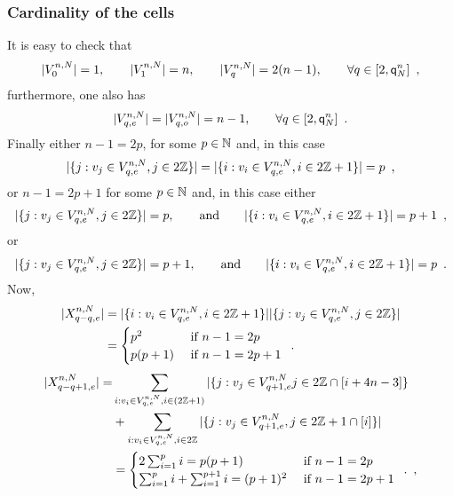 \subsubsection{Cardinality of the cells}
It is easy to check that 
\[
|V_{0}^{n,N}|=1, \qquad |V_{1}^{n,N}|=n,\qquad |V_{q}^{n,N}|=2(n-1),\qquad\forall q\in[2,{\mathsf{q}}^{n}_{N}]\enspace,
\]
furthermore, one also has
\[
|V_{q,e}^{n,N}|=|V_{q,o}^{n,N}|=n-1,\qquad \forall q\in [2,{\mathsf{q}}^{n}_{N}]\enspace.
\]
Finally either $n-1=2p$, for some $p\in \mathbb{N}$ and, in this case 
\[
|\{j: v_j\in V_{q,e}^{n,N},j\in 2\mathbb{Z}\}|=|\{i : v_i\in V_{q,e}^{n,N},i\in 2\mathbb{Z}+1\}|=p\enspace,
\]
or $n-1=2p+1$ for some $p\in \mathbb{N}$ and, in this case either 
\[
|\{j: v_j\in V_{q,e}^{n,N},j\in 2\mathbb{Z}\}|=p,\qquad\text{and}\qquad |\{i : v_i\in V_{q,e}^{n,N},i\in 2\mathbb{Z}+1\}|=p+1\enspace,
\]
or 
\[
|\{j: v_j\in V_{q,e}^{n,N},j\in 2\mathbb{Z}\}|=p+1,\qquad\text{and}\qquad |\{i : v_i\in V_{q,e}^{n,N},i\in 2\mathbb{Z}+1\}|=p\enspace.
\]
Now,
\begin{align*}
|X_{q- q,e}^{n,N}|&=|\{i : v_i\in V_{q,e}^{n,N},i\in 2\mathbb{Z}+1\}||\{j: v_j\in V_{q,e}^{n,N},j\in 2\mathbb{Z}\}|\\
&=
\begin{cases}
 p^2&\text{ if }n-1=2p\\
 p(p+1)&\text{ if }n-1=2p+1
\end{cases}
\enspace. 
\end{align*}
\begin{align*}
|X_{q- q+1,e}^{n,N}|=&\sum_{i : v_i\in V_{q,e}^{n,N},i\in(2\mathbb{Z}+1)}|\{j : v_j\in V_{q+1,e}^{n,N}j\in 2\mathbb{Z}\cap [i+4n-3]\}\\
&+\sum_{i : v_i\in V_{q,e}^{n,N},i\in 2\mathbb{Z}}|\{j: v_j\in V_{q+1,e}^{n,N},j\in 2\mathbb{Z}+1\cap [i]\}|\\
&=
\begin{cases}
2\sum_{i=1}^pi=p(p+1) &\text{ if }n-1=2p\\
\sum_{i=1}^pi+\sum_{i=1}^{p+1}i=(p+1)^2 &\text{ if }n-1=2p+1
\end{cases}
\enspace.
\enspace,
\end{align*}

